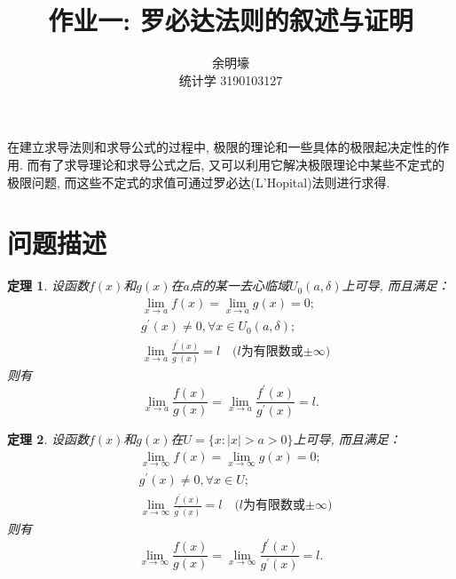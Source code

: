 \documentclass{ctexart}
\title{作业一: 罗必达法则的叙述与证明}
\author{余明壕\\统计学 3190103127}
\begin{document}
\newtheorem{theorem}{定理}

\maketitle
在建立求导法则和求导公式的过程中, 极限的理论和一些具体的极限起决定性的作用. 而有了求导理论和求导公式之后, 又可以利用它解决极限理论中某些不定式的极限问题, 而这些不定式的求值可通过罗必达(L'Hopital)法则进行求得. 
\section{问题描述}
\begin{theorem}\label{theorem1}
    设函数$f(x)$和$g(x)$在$a$点的某一去心临域$U_0(a, \delta)$上可导, 而且满足：
    \begin{align}
        \label{condition1. 1}
        &\lim\limits_{x\rightarrow a}f(x)=\lim\limits_{x\rightarrow a}g(x)=0;\\ 
        \label{condition1. 2}
        &g^{'}(x)\not=0, \forall x\in U_0(a, \delta);\\ 
        \label{condition1. 3}
        &\lim\limits_{x\rightarrow a}\frac{f^{'}(x)}{g^{'}(x)}=l\quad \text{($l$为有限数或$\pm\infty$)}
    \end{align}
    则有
    \begin{equation}\label{conclusion1}
        \lim_{x\rightarrow a}\frac{f(x)}{g(x)}=\lim_{x\rightarrow a}\frac{f^{'}(x)}{g^{'}(x)}=l.
    \end{equation}
\end{theorem}
\begin{theorem}\label{theorem2}
    设函数$f(x)$和$g(x)$在$U=\{x:|x|>a>0\}$上可导, 而且满足：
    \begin{align}
        \label{condition2. 1}
        &\lim\limits_{x\rightarrow \infty}f(x)=\lim\limits_{x\rightarrow \infty}g(x)=0;\\ 
        \label{condition2. 2}
        &g^{'}(x)\not=0, \forall x\in U;\\ 
        \label{condition2. 3}
        &\lim\limits_{x\rightarrow \infty}\frac{f^{'}(x)}{g^{'}(x)}=l\quad \text{($l$为有限数或$\pm\infty$)}
    \end{align}
    则有
    \begin{equation}\label{conclusion2}
        \lim_{x\rightarrow \infty}\frac{f(x)}{g(x)}=\lim_{x\rightarrow \infty}\frac{f^{'}(x)}{g^{'}(x)}=l.
    \end{equation}
\end{theorem}
\end{document}
